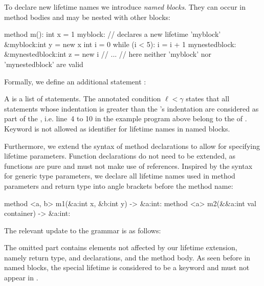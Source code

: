 To declare new lifetime names we introduce \emph{named blocks}.
They can occur in method bodies and may be nested with other blocks:

\begin{whileycode}
method m():
	int x = 1
	myblock: // declares a new lifetime 'myblock'
		&myblock:int y = new x
		int i = 0
		while (i < 5):
			i = i + 1
			mynestedblock:
				&mynestedblock:int z = new i
				// ...
	// here neither 'myblock' nor 'mynestedblock' are valid
\end{whileycode}

\noindent Formally, we define an additional statement :
\begin{syntax}
\syntaxcondition{$\ell < \gamma$}
\end{syntax}
\noindent A  is a list of statements.
The annotated condition $\ell < \gamma$ states that all statements whose indentation is greater than the 's indentation are considered as part of the , i.e. line~4 to 10 in the example program above belong to the  of .
Keyword  is not allowed as identifier for lifetime names in named blocks.

Furthermore, we extend the syntax of method declarations to allow for specifying lifetime parameters.
Function declarations do not need to be extended, as functions are pure and must not make use of references.
Inspired by the syntax for \java generic type parameters, we declare all lifetime names used in method parameters and return type into angle brackets before the method name:

\begin{whileycode}
method <a, b> m1(&a:int x, &b:int y) -> &a:int:
method <a> m2(&{&a:int val} container) -> &a:int:
\end{whileycode}

\noindent The relevant update to the grammar is as follows:
\begin{syntax}
\end{syntax}
\noindent The omitted part contains elements not affected by our lifetime extension, namely return type,  and  declarations, and the method body.
As seen before in named blocks, the special lifetime  is considered to be a keyword and must not appear in .


